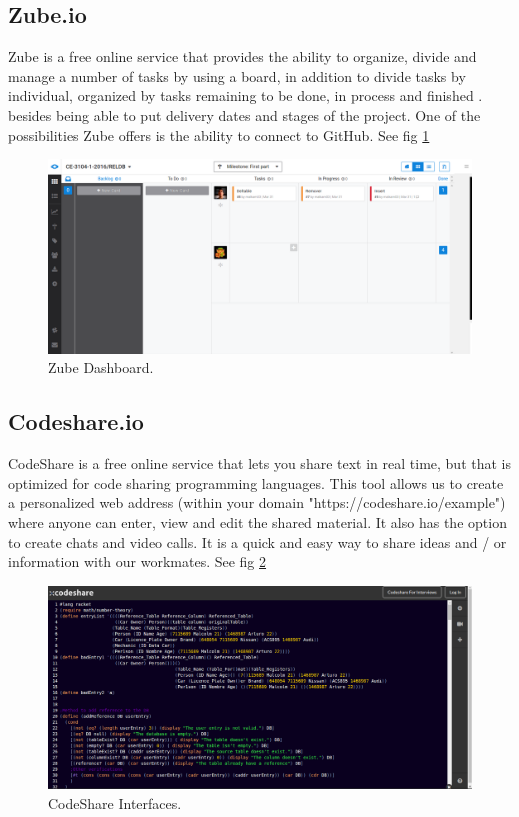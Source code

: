 \documentclass[12pt]{article}
\begin{document}
\begin{itemize}
\subsection{Zube.io}
Zube is a free online service that provides the ability to organize, divide and manage a number of tasks by using a board, in addition to divide tasks by individual, organized by tasks remaining to be done, in process and finished . besides being able to put delivery dates and stages of the project. One of the possibilities Zube offers is the ability to connect to GitHub. See fig \ref{zube}
\begin{figure}[h!]
 	\centering
  	\includegraphics[scale=0.3]
  	{Images/zube.png}
  	\caption{Zube Dashboard.}
     \label{zube}
\end{figure}

\subsection{Codeshare.io}
CodeShare is a free online service that lets you share text in real time, but that is optimized for code sharing programming languages. This tool allows us to create a personalized web address (within your domain "https://codeshare.io/example") where anyone can enter, view and edit the shared material. It also has the option to create chats and video calls. It is a quick and easy way to share ideas and / or information with our workmates. See fig \ref{codeshare}
\begin{figure}[h!]
 	\centering
  	\includegraphics[scale=0.3]
  	{Images/CodeShare.png}
  	\caption{CodeShare Interfaces.}
     \label{codeshare}
\end{figure}


\end{itemize}
\end{document}
